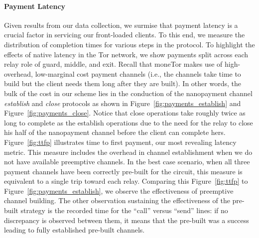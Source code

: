

\paragraph*{Payment Latency}
Given results from our data collection, we surmise that payment latency is a
crucial factor in servicing our front-loaded clients. To this end, we measure
the distribution of completion times for various steps in the protocol. To
highlight the effects of native latency in the Tor network, we show payments
split across each relay role of guard, middle, and exit. Recall that moneTor
makes use of high-overhead, low-marginal cost payment channels (i.e., the
channels take time to build but the client needs them long after they are
built). In other words, the bulk of the cost in our scheme lies in the
conduction of the nanopayment channel \emph{establish} and \emph{close}
protocols as shown in Figure~\ref{fig:payments_establish} and
Figure~\ref{fig:payments_close}. Notice that close operations take roughly twice
as long to complete as the establish operations due to the need for the relay to
close his half of the nanopayment channel before the client can complete hers.
Figure~\ref{fig:ttfp} illustrates time to first payment, our most revealing
latency metric. This measure includes the overhead in channel establishment when
we do not have available preemptive channels. In the best case scenario, when
all three payment channels have been correctly pre-built for the circuit, this
measure is equivalent to a single trip toward each relay. Comparing this
Figure~\ref{fig:ttfp} to Figure~\ref{fig:payments_establish}, we observe the
effectiveness of preemptive channel building. The other observation sustaining
the effectiveness of the pre-built strategy is the recorded time for the
``call'' versus ``send'' lines: if no discrepancy is observed between them, it means that the pre-built was a success leading to fully established pre-built channels.

